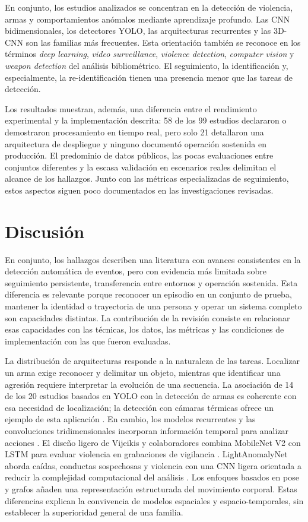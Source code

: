\documentclass[pdflatex,sn-mathphys-num]{sn-jnl}%
\theoremstyle{thmstyleone}%
\theoremstyle{thmstyletwo}%
\theoremstyle{thmstylethree}%
\begin{document}
En conjunto, los estudios analizados se concentran en la detección de violencia,
armas y comportamientos anómalos mediante aprendizaje profundo. Las CNN
bidimensionales, los detectores YOLO, las arquitecturas recurrentes y las 3D-CNN
son las familias más frecuentes. Esta orientación también se reconoce en los
términos \textit{deep learning}, \textit{video surveillance}, \textit{violence detection},
\textit{computer vision} y \textit{weapon detection} del análisis bibliométrico.
El seguimiento, la identificación y, especialmente, la re-identificación tienen
una presencia menor que las tareas de detección.

Los resultados muestran, además, una diferencia entre el rendimiento experimental
y la implementación descrita: 58 de los 99 estudios declararon o demostraron
procesamiento en tiempo real, pero solo 21 detallaron una arquitectura de despliegue
y ninguno documentó operación sostenida en producción. El predominio de datos
públicos, las pocas evaluaciones entre conjuntos diferentes y la escasa validación
en escenarios reales delimitan el alcance de los hallazgos. Junto con las métricas
especializadas de seguimiento, estos aspectos siguen poco documentados en las
investigaciones revisadas.

\FloatBarrier
\section{Discusión}\label{sec12}

En conjunto, los hallazgos describen una literatura con avances consistentes en la detección automática de eventos, pero con evidencia más limitada sobre seguimiento persistente, transferencia entre entornos y operación sostenida. Esta diferencia es relevante porque reconocer un episodio en un conjunto de prueba, mantener la identidad o trayectoria de una persona y operar un sistema completo son capacidades distintas. La contribución de la revisión consiste en relacionar esas capacidades con las técnicas, los datos, las métricas y las condiciones de implementación con las que fueron evaluadas.

La distribución de arquitecturas responde a la naturaleza de las tareas. Localizar un arma exige reconocer y delimitar un objeto, mientras que identificar una agresión requiere interpretar la evolución de una secuencia. La asociación de 14 de los 20 estudios basados en YOLO con la detección de armas es coherente con esa necesidad de localización; la detección con cámaras térmicas ofrece un ejemplo de esta aplicación \cite{munoz2025}. En cambio, los modelos recurrentes y las convoluciones tridimensionales incorporan información temporal para analizar acciones \cite{sernani2021}. El diseño ligero de Vijeikis y colaboradores combina MobileNet V2 con LSTM para evaluar violencia en grabaciones de vigilancia \cite{vijeikis2022}. LightAnomalyNet aborda caídas, conductas sospechosas y violencia con una CNN ligera orientada a reducir la complejidad computacional del análisis \cite{mehmood2021}. Los enfoques basados en pose y grafos añaden una representación estructurada del movimiento corporal. Estas diferencias explican la convivencia de modelos espaciales y espacio-temporales, sin establecer la superioridad general de una familia.
\end{document}
